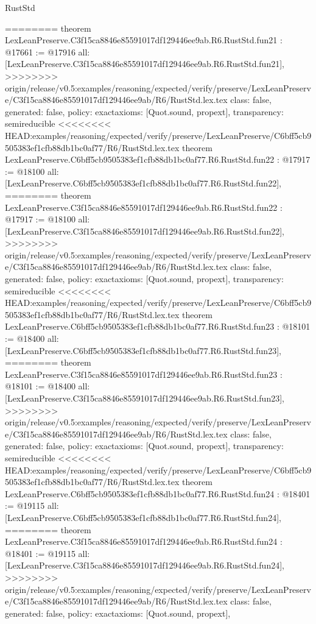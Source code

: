 \begin{lexlean}{RustStd}
\begin{coremodule}
{\begin{coremodule}
{{{{{{{{{{{{{{{{{{{{{{{{========
theorem LexLeanPreserve.C3f15ca8846e85591017df129446ee9ab.R6.RustStd.fun21 : @17661 := @17916 {
  all: [LexLeanPreserve.C3f15ca8846e85591017df129446ee9ab.R6.RustStd.fun21],
>>>>>>>> origin/release/v0.5:examples/reasoning/expected/verify/preserve/LexLeanPreserve/C3f15ca8846e85591017df129446ee9ab/R6/RustStd.lex.tex
  class: false,
  generated: false,
  policy: exact{axioms: [Quot.sound, propext]},
  transparency: semireducible
}
<<<<<<<< HEAD:examples/reasoning/expected/verify/preserve/LexLeanPreserve/C6bff5cb9505383ef1cfb88db1bc0af77/R6/RustStd.lex.tex
theorem LexLeanPreserve.C6bff5cb9505383ef1cfb88db1bc0af77.R6.RustStd.fun22 : @17917 := @18100 {
  all: [LexLeanPreserve.C6bff5cb9505383ef1cfb88db1bc0af77.R6.RustStd.fun22],
========
theorem LexLeanPreserve.C3f15ca8846e85591017df129446ee9ab.R6.RustStd.fun22 : @17917 := @18100 {
  all: [LexLeanPreserve.C3f15ca8846e85591017df129446ee9ab.R6.RustStd.fun22],
>>>>>>>> origin/release/v0.5:examples/reasoning/expected/verify/preserve/LexLeanPreserve/C3f15ca8846e85591017df129446ee9ab/R6/RustStd.lex.tex
  class: false,
  generated: false,
  policy: exact{axioms: [Quot.sound, propext]},
  transparency: semireducible
}
<<<<<<<< HEAD:examples/reasoning/expected/verify/preserve/LexLeanPreserve/C6bff5cb9505383ef1cfb88db1bc0af77/R6/RustStd.lex.tex
theorem LexLeanPreserve.C6bff5cb9505383ef1cfb88db1bc0af77.R6.RustStd.fun23 : @18101 := @18400 {
  all: [LexLeanPreserve.C6bff5cb9505383ef1cfb88db1bc0af77.R6.RustStd.fun23],
========
theorem LexLeanPreserve.C3f15ca8846e85591017df129446ee9ab.R6.RustStd.fun23 : @18101 := @18400 {
  all: [LexLeanPreserve.C3f15ca8846e85591017df129446ee9ab.R6.RustStd.fun23],
>>>>>>>> origin/release/v0.5:examples/reasoning/expected/verify/preserve/LexLeanPreserve/C3f15ca8846e85591017df129446ee9ab/R6/RustStd.lex.tex
  class: false,
  generated: false,
  policy: exact{axioms: [Quot.sound, propext]},
  transparency: semireducible
}
<<<<<<<< HEAD:examples/reasoning/expected/verify/preserve/LexLeanPreserve/C6bff5cb9505383ef1cfb88db1bc0af77/R6/RustStd.lex.tex
theorem LexLeanPreserve.C6bff5cb9505383ef1cfb88db1bc0af77.R6.RustStd.fun24 : @18401 := @19115 {
  all: [LexLeanPreserve.C6bff5cb9505383ef1cfb88db1bc0af77.R6.RustStd.fun24],
========
theorem LexLeanPreserve.C3f15ca8846e85591017df129446ee9ab.R6.RustStd.fun24 : @18401 := @19115 {
  all: [LexLeanPreserve.C3f15ca8846e85591017df129446ee9ab.R6.RustStd.fun24],
>>>>>>>> origin/release/v0.5:examples/reasoning/expected/verify/preserve/LexLeanPreserve/C3f15ca8846e85591017df129446ee9ab/R6/RustStd.lex.tex
  class: false,
  generated: false,
  policy: exact{axioms: [Quot.sound, propext]},
}}}}}}}}}}}}}}}}}}}}}}}}}}}}
\end{coremodule}}
\end{coremodule}
\end{lexlean}
